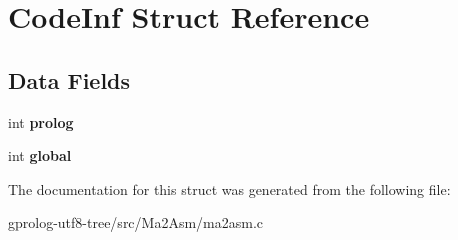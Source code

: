 \hypertarget{structCodeInf}{}\section{Code\+Inf Struct Reference}
\label{structCodeInf}
\subsection*{Data Fields}
\begin{DoxyCompactItemize}
\item 
int {\bfseries prolog}\hypertarget{structCodeInf_a1010280a1eff3f13adae9b219d07c4cb}{}\label{structCodeInf_a1010280a1eff3f13adae9b219d07c4cb}

\item 
int {\bfseries global}\hypertarget{structCodeInf_a0819cfe0da8345734d7e3b6964caf566}{}\label{structCodeInf_a0819cfe0da8345734d7e3b6964caf566}

\end{DoxyCompactItemize}


The documentation for this struct was generated from the following file\+:\begin{DoxyCompactItemize}
\item 
gprolog-\/utf8-\/tree/src/\+Ma2\+Asm/ma2asm.\+c\end{DoxyCompactItemize}
